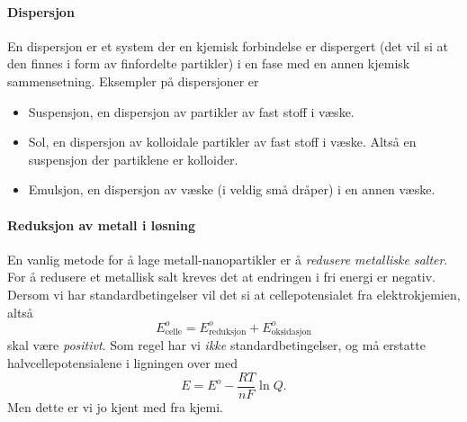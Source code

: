 \paragraph{Dispersjon} En dispersjon er et system der en kjemisk forbindelse er dispergert (det vil si at den finnes i form av finfordelte partikler) i en fase med en annen kjemisk sammensetning. Eksempler på dispersjoner er
\begin{itemize}
	\item Suspensjon, en dispersjon av partikler av fast stoff i væske.
	\item Sol, en dispersjon av kolloidale partikler av fast stoff i væske. Altså en suspensjon der partiklene er kolloider.
	\item Emulsjon, en dispersjon av væske (i veldig små dråper) i en annen væske.
\end{itemize}

\paragraph{Reduksjon av metall i løsning} En vanlig metode for å lage metall-nanopartikler er å \emph{redusere metalliske salter}. For å redusere et metallisk salt kreves det at endringen i fri energi er negativ. Dersom vi har standardbetingelser vil det si at cellepotensialet fra elektrokjemien, altså
\begin{equation}
	E^o_{\text{celle}} = E^o_{\text{reduksjon}} + E^o_{\text{oksidasjon}}
\end{equation}
skal være \emph{positivt}. Som regel har vi \emph{ikke} standardbetingelser, og må erstatte halvcellepotensialene i ligningen over med
\begin{equation}
	E = E^o - \frac{RT}{nF}\ln Q.
\end{equation}
Men dette er vi jo kjent med fra kjemi.

